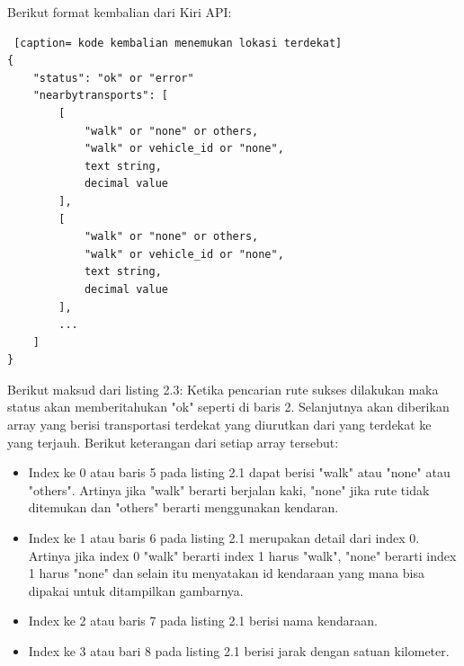 \vspace{5mm}
Berikut format kembalian dari Kiri API:

\begin{lstlisting} [caption= kode kembalian menemukan lokasi terdekat]
{
    "status": "ok" or "error"
    "nearbytransports": [
        [
            "walk" or "none" or others,
            "walk" or vehicle_id or "none",
            text string,
            decimal value
        ],
        [
            "walk" or "none" or others,
            "walk" or vehicle_id or "none",
            text string,
            decimal value
        ],
        ...     
    ]
}\end{lstlisting}
Berikut maksud dari listing 2.3:
\hspace{0.5cm} Ketika pencarian rute sukses dilakukan maka status akan memberitahukan "ok" seperti di baris 2. Selanjutnya akan diberikan array yang berisi transportasi terdekat yang diurutkan dari yang terdekat ke yang terjauh. Berikut keterangan dari setiap array tersebut: 
\begin{itemize}
	\item Index ke 0 atau baris 5 pada listing 2.1 dapat berisi "walk" atau "none" atau "others". Artinya  jika "walk" berarti berjalan kaki, "none" jika rute tidak ditemukan dan "others" berarti menggunakan kendaran.
	\item Index ke 1 atau baris 6 pada listing 2.1 merupakan detail dari index 0. Artinya jika index 0 "walk" berarti index 1 harus "walk", "none" berarti index 1 harus "none" dan selain itu menyatakan id kendaraan yang mana bisa dipakai untuk ditampilkan gambarnya.
	\item Index ke 2 atau baris 7 pada listing 2.1 berisi nama kendaraan.
	\item Index ke 3 atau bari 8 pada listing 2.1 berisi jarak dengan satuan kilometer.
\end{itemize}